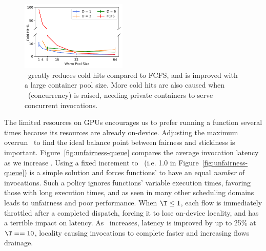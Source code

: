 \begin{figure}
  \includegraphics[width=0.45\textwidth]{../graphs/container_pool/big-60min/65/cold_hits.pdf}
  \vspace*{\captionspace}
  \caption{\QName~greatly reduces cold hits compared to FCFS, and is improved with a large container pool size. 
          More cold hits are also caused when \D~(concurrency) is raised, needing private containers to serve concurrent invocations.}
    \label{fig:container-pool-cold-hits}
    \vspace{-0.4cm}
\end{figure}

The limited resources on GPUs encourages us to prefer running a function several times because its resources are already on-device.
Adjusting the maximum overrun \T~to find the ideal balance point between fairness and stickiness is important.
Figure~\ref{fig:unfairness-queue} compares the average invocation latency as we increase \T.
Using a fixed increment to \VT~(i.e. 1.0 in Figure~\ref{fig:unfairness-queue}) is a simple solution and forces functions' to have an equal \emph{number} of invocations.
Such a policy ignores functions' variable execution times, favoring those with long execution times, and as seen in many other scheduling domains leads to unfairness and poor performance.
When $\T \le 1$, each flow is immediately throttled after a completed dispatch, forcing it to lose on-device locality, and has a terrible impact on latency.
As \T~increases, latency is improved by up to 25\% at $\T == 10$, locality causing invocations to complete faster and increasing flows drainage.

